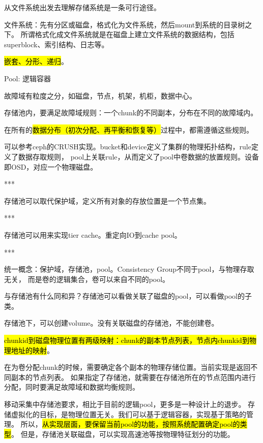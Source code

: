 从文件系统出发去理解存储系统是一条可行途径。

文件系统：先有分区或磁盘，格式化为文件系统，然后mount到系统的目录树之下。
所谓格式化成文件系统就是在磁盘上建立文件系统的数据结构，包括superblock、索引结构、日志等。

\hl{嵌套、分形、递归}。


Pool: 逻辑容器

故障域有粒度之分，如磁盘，节点，机架，机柜，数据中心。

存储池内，要满足故障域规则：一个chunk的不同副本，分布在不同的故障域内。\label{rule:faultset}

在所有的\hl{数据分布（初次分配、再平衡和恢复等）}过程中，都需遵循这些规则。

\begin{tcolorbox}

可以参考ceph的CRUSH实现。bucket和device定义了集群的物理拓扑结构，rule定义了数据存取规则，
pool上关联rule，从而定义了pool中卷数据的放置规则。设备即OSD，对应一个物理磁盘。

***

存储池可以取代保护域，定义所有对象的存放位置是一个节点集。

***

存储池可以用来实现tier cache。重定向IO到cache pool。

***

统一概念：保护域，存储池，pool。Consistency Group不同于pool，与物理存取无关，
而是卷的逻辑集合，卷可以来自不同的pool。

\end{tcolorbox}

与存储池有什么同和异？存储池可以看做关联了磁盘的pool，可以看做pool的子类。


存储池下，可以创建volume。没有关联磁盘的存储池，不能创建卷。

\hl{chunkid到磁盘物理位置有两级映射：chunk的副本节点列表，节点内chunkid到物理地址的映射}。

在为卷分配chunk的时候，需要确定各个副本的物理存储位置。当前实现是返回不同副本的节点列表。
如果指定了存储池，就需要在存储池所在的节点范围内进行分配，同时要满足故障域和数据均衡规则。

\begin{tcolorbox}
移动采集中存储池要求，相比于目前的逻辑pool，更多是一种设计上的退步。
存储虚拟化的目标，是物理位置无关。我们可以基于逻辑容器，实现基于策略的管理。
所以，\hl{从实现层面，要保留当前pool的功能，按照系统配置确定pool的类型}。
但是，存储池关联磁盘，可以实现高速池等按物理特征划分的功能。
\end{tcolorbox}

